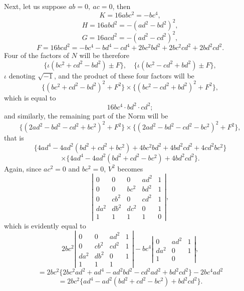 \documentclass[11pt]{article}
\begin{document}
{{Next, let us suppose $ab=0,\ ac=0$, then
\[
K=16abc^2=-bc^4,
\]
\[
H=16abd^2=-(ad^2-bd^2)^2,
\]
\[
G=16acd^2=-(ad^2-cd^2)^2,
\]
\[
F=16bcd^2=-bc^4-bd^4-cd^4+2bc^2bd^2+2bc^2cd^2+2bd^2cd^2.
\]
Four of the factors of $N$ will be therefore
\[
\{\iota(bc^2+cd^2-bd^2)\pm F\},\quad \{\iota(bc^2-cd^2+bd^2)\pm F\},
\]
$\iota$ denoting $\sqrt{-1}$, and the product of these four factors will be
\[
\{(bc^2+cd^2-bd^2)^2+F^2\}\times\{(bc^2-cd^2+bd^2)^2+F^2\},
\]
which is equal to
\[
16bc^4\cdot bd^2\cdot cd^2;
\]
and similarly, the remaining part of the Norm will be
\[
\{(2ad^2-bd^2-cd^2+bc^2)^2+F^2\}\times\{(2ad^2-bd^2-cd^2-bc^2)^2+F^2\},
\]
that is
\[
\{4ad^4-4ad^2(bd^2+cd^2+bc^2)+4bc^2bd^2+4bd^2cd^2+4cd^2bc^2\}
\]
\[
\times\{4ad^4-4ad^2(bd^2+cd^2-bc^2)+4bd^2cd^2\}.
\]
Again, since $ac^2=0$ and $bc^2=0$, $V^2$ becomes
\[
\left|\begin{array}{ccccc}
0&0&0&ad^2&1\\
0&0&bc^2&bd^2&1\\
0&cb^2&0&cd^2&1\\
da^2&db^2&dc^2&0&1\\
1&1&1&1&0
\end{array}\right|,
\]
which is evidently equal to
\[
2bc^2
\left|\begin{array}{cccc}
0&0&ad^2&1\\
0&cb^2&cd^2&1\\
da^2&db^2&0&1\\
1&1&1&
\end{array}\right|
-bc^4
\left|\begin{array}{ccc}
0&ad^2&1\\
da^2&0&1\\
1&0&
\end{array}\right|,
\]
\[
=2bc^2\{2bc^2ad^2+ad^4-ad^2bd^2-cd^2ad^2+bd^2cd^2\}-2bc^4ad^2
\]
\[
=2bc^2\{ad^4-ad^2(bd^2+cd^2-bc^2)+bd^2cd^2\}.
\]

}}
\end{document}
